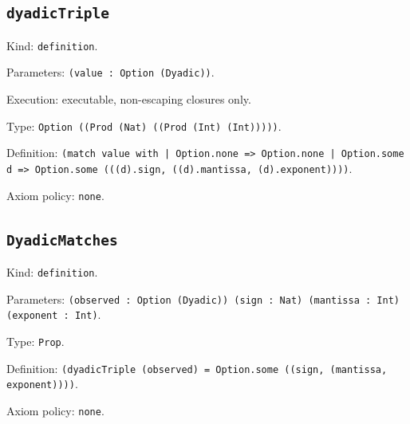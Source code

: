 \documentclass[11pt]{article}
\begin{document}
\subsection*{\texttt{dyadicTriple}}
\noindent Kind: \texttt{definition}.\par
\noindent Parameters: \texttt{(value : Option (Dyadic))}.\par
\noindent Execution: executable, non-escaping closures only.\par
\noindent Type: \texttt{Option ((Prod (Nat) ((Prod (Int) (Int)))))}.\par
\noindent Definition: \texttt{(match value with | Option.none => Option.none | Option.some d => Option.some (((d).sign, ((d).mantissa, (d).exponent))))}.\par
\noindent Axiom policy: \texttt{none}.\par
\subsection*{\texttt{DyadicMatches}}
\noindent Kind: \texttt{definition}.\par
\noindent Parameters: \texttt{(observed : Option (Dyadic)) (sign : Nat) (mantissa : Int) (exponent : Int)}.\par
\noindent Type: \texttt{Prop}.\par
\noindent Definition: \texttt{(dyadicTriple (observed) = Option.some ((sign, (mantissa, exponent))))}.\par
\noindent Axiom policy: \texttt{none}.\par
\end{document}
